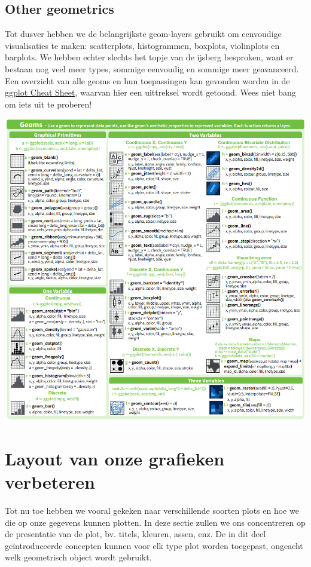 \documentclass[]{tufte-book}
\begin{document}
\hypertarget{other-geometrics}{%
\subsection{Other geometrics}\label{other-geometrics}}

Tot dusver hebben we de belangrijkste geom-layers gebruikt om eenvoudige visualisaties te maken: scatterplots, histogrammen, boxplots, violinplots en barplots. We hebben echter slechts het topje van de ijsberg besproken, want er bestaan nog veel meer types, sommige eenvoudig en sommige meer geavanceerd. Een overzicht van alle geoms en hun toepassingen kan gevonden worden in de \href{https://www.rstudio.com/wp-content/uploads/2015/12/ggplot2-cheatsheet-2.0.pdf}{ggplot Cheat Sheet}, waarvan hier een uittreksel wordt getoond. Wees niet bang om iets uit te proberen!

\includegraphics{images/geoms.PNG}

\hypertarget{layout-van-onze-grafieken-verbeteren}{%
\section{Layout van onze grafieken verbeteren}\label{layout-van-onze-grafieken-verbeteren}}

Tot nu toe hebben we vooral gekeken naar verschillende soorten plots en hoe we die op onze gegevens kunnen plotten. In deze sectie zullen we ons concentreren op de presentatie van de plot, bv. titels, kleuren, assen, enz. De in dit deel geïntroduceerde concepten kunnen voor elk type plot worden toegepast, ongeacht welk geometrisch object wordt gebruikt.
\end{document}
